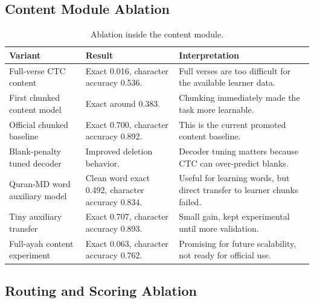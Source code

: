 \documentclass[12pt,a4paper]{report}
\begin{document}
\subsection{Content Module Ablation}

\begin{table}[H]
\centering
\small
\begin{tabularx}{\textwidth}{p{} p{} X}
\toprule
\textbf{Variant} & \textbf{Result} & \textbf{Interpretation} \\
\midrule
Full-verse CTC content &
Exact 0.016, character accuracy 0.536. &
Full verses are too difficult for the available learner data. \\
\midrule
First chunked content model &
Exact around 0.383. &
Chunking immediately made the task more learnable. \\
\midrule
Official chunked baseline &
Exact 0.700, character accuracy 0.892. &
This is the current promoted content baseline. \\
\midrule
Blank-penalty tuned decoder &
Improved deletion behavior. &
Decoder tuning matters because CTC can over-predict blanks. \\
\midrule
Quran-MD word auxiliary model &
Clean word exact 0.492, character accuracy 0.834. &
Useful for learning words, but direct transfer to learner chunks failed. \\
\midrule
Tiny auxiliary transfer &
Exact 0.707, character accuracy 0.893. &
Small gain, kept experimental until more validation. \\
\midrule
Full-ayah content experiment &
Exact 0.063, character accuracy 0.762. &
Promising for future scalability, not ready for official use. \\
\bottomrule
\end{tabularx}
\caption{Ablation inside the content module.}
\label{tab:content_ablation}
\end{table}

\subsection{Routing and Scoring Ablation}
\end{document}
